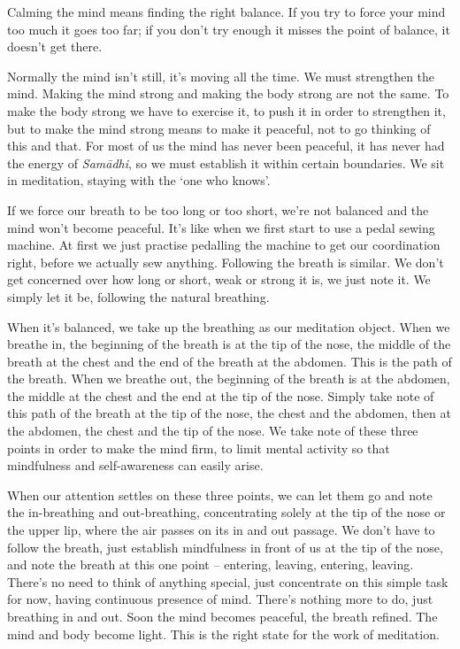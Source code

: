 
Calming the mind means finding the right balance. If you try to force your mind too much it goes too far; if you don't try enough it misses the point of balance, it doesn't get there.

Normally the mind isn't still, it's moving all the time. We must strengthen the mind. Making the mind strong and making the body strong are not the same. To make the body strong we have to exercise it, to push it in order to strengthen it, but to make the mind strong means to make it peaceful, not to go thinking of this and that. For most of us the mind has never been peaceful, it has never had the energy of \textit{Sam\=adhi}, so we must establish it within certain boundaries. We sit in meditation, staying with the `one who knows'.

If we force our breath to be too long or too short, we're not balanced and the mind won't become peaceful. It's like when we first start to use a pedal sewing machine. At first we just practise pedalling the machine to get our coordination right, before we actually sew anything. Following the breath is similar. We don't get concerned over how long or short, weak or strong it is, we just note it. We simply let it be, following the natural breathing.

When it's balanced, we take up the breathing as our meditation object. When we breathe in, the beginning of the breath is at the tip of the nose, the middle of the breath at the chest and the end of the breath at the abdomen. This is the path of the breath. When we breathe out, the beginning of the breath is at the abdomen, the middle at the chest and the end at the tip of the nose. Simply take note of this path of the breath at the tip of the nose, the chest and the abdomen, then at the abdomen, the chest and the tip of the nose. We take note of these three points in order to make the mind firm, to limit mental activity so that mindfulness and self-awareness can easily arise.

When our attention settles on these three points, we can let them go and note the in-breathing and out-breathing, concentrating solely at the tip of the nose or the upper lip, where the air passes on its in and out passage. We don't have to follow the breath, just establish mindfulness in front of us at the tip of the nose, and note the breath at this one point -- entering, leaving, entering, leaving. There's no need to think of anything special, just concentrate on this simple task for now, having continuous presence of mind. There's nothing more to do, just breathing in and out. Soon the mind becomes peaceful, the breath refined. The mind and body become light. This is the right state for the work of meditation.

